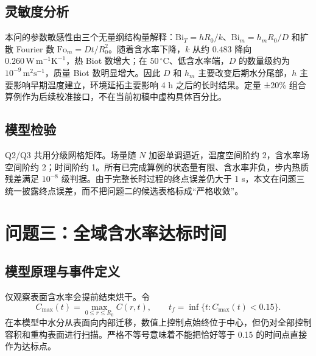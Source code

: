\documentclass[withoutpreface,bwprint]{cumcmthesis}
\begin{document}
\subsection{灵敏度分析}
本问的参数敏感性由三个无量纲结构量解释：$\mathrm{Bi}_T=hR_0/k$、$\mathrm{Bi}_m=h_mR_0/D$ 和扩散 Fourier 数 $\mathrm{Fo}_m=Dt/R_0^2$。随着含水率下降，$k$ 从约 $0.483$ 降向 $0.260\,\mathrm{W\,m^{-1}K^{-1}}$，热 Biot 数增大；在 $50\,^{\circ}\mathrm{C}$、低含水率端，$D$ 的数量级约为 $10^{-9}\,\mathrm{m^2s^{-1}}$，质量 Biot 数明显增大。因此 $D$ 和 $h_m$ 主要改变后期水分尾部，$h$ 主要影响早期温度建立，环境延拓主要影响 4 h 之后的长时结果。定量 ±20\% 组合算例作为后续校准接口，不在当前初稿中虚构具体百分比。
\subsection{模型检验}
Q2/Q3 共用分级网格矩阵。场量随 $N$ 加密单调逼近，温度空间阶约 2，含水率场空间阶约 2；时间阶约 1。所有已完成算例的状态量有限、含水率非负，步内热质残差满足 $10^{-8}$ 级判据。由于完整长时过程的终点误差仍大于 1 s，本文在问题三统一披露终点误差，而不把问题二的候选表格标成“严格收敛”。

\section{问题三：全域含水率达标时间}
\subsection{模型原理与事件定义}
仅观察表面含水率会提前结束烘干。令
\begin{equation} C_{\max}(t)=\max_{0\le r\le R_0}C(r,t),\qquad t_f=\inf\{t:C_{\max}(t)<0.15\}. \end{equation}
在本模型中水分从表面向内部迁移，数值上控制点始终位于中心，但仍对全部控制容积和重构表面进行扫描。严格不等号意味着不能把恰好等于 0.15 的时间点直接作为达标点。
\end{document}
